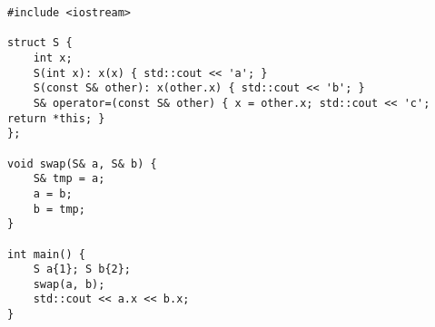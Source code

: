 \begin{lstlisting}[title=\href{https://godbolt.org/z/W7ldmi}{\texttt{godbolt.org/z/W7ldmi}}]
#include <iostream>

struct S { 
    int x;
    S(int x): x(x) { std::cout << 'a'; }
    S(const S& other): x(other.x) { std::cout << 'b'; }
    S& operator=(const S& other) { x = other.x; std::cout << 'c'; return *this; }
};

void swap(S& a, S& b) {
    S& tmp = a;
    a = b;
    b = tmp;
}

int main() {
    S a{1}; S b{2};
    swap(a, b);
    std::cout << a.x << b.x;
}
\end{lstlisting}
